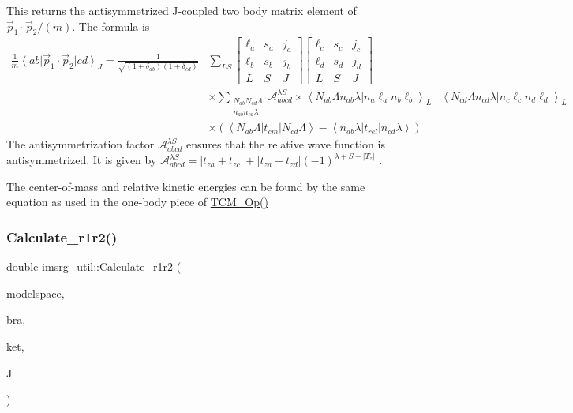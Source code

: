 This returns the antisymmetrized J-\/coupled two body matrix element of $ \vec{p}_1 \cdot \vec{p}_2 / (m) $. The formula is \begin{eqnarray*} \frac{1}{m} \left \langle a b \right| \vec{p}_1 \cdot \vec{p}_2 \left| c d \right \rangle_J = \frac{1}{\sqrt{(1+\delta_{ab})(1+\delta_{cd})}} &\sum\limits_{LS} \left[ \begin{array}{ccc} \ell_a & s_a & j_a \\ \ell_b & s_b & j_b \\ L & S & J \end{array} \right] \left[ \begin{array}{ccc} \ell_c & s_c & j_c \\ \ell_d & s_d & j_d \\ L & S & J \end{array} \right] & \\ & \times \sum\limits_{\substack{N_{ab}N_{cd} \Lambda \\ n_{ab} n_{cd} \lambda}} \mathcal{A}_{abcd}^{\lambda S} \times \left\langle N_{ab}\Lambda n_{ab} \lambda | n_{a} \ell_{a} n_{b} \ell_{b} \right\rangle_{L} & \left\langle N_{cd}\Lambda n_{cd} \lambda | n_{c} \ell_{c} n_{d} \ell_{d} \right\rangle_{L} \\ & \times \left( \left\langle N_{ab}\Lambda | t_{cm} | N_{cd} \Lambda \right \rangle -\left\langle n_{ab}\lambda | t_{rel} | n_{cd} \lambda \right \rangle \right) \end{eqnarray*} The antisymmetrization factor $ \mathcal{A}_{abcd}^{\lambda S} $ ensures that the relative wave function is antisymmetrized. It is given by $ \mathcal{A}_{abcd}^{\lambda S} = \left|t_{za}+t_{zc}\right| + \left| t_{za} + t_{zd} \right| (-1)^{\lambda + S + \left|T_z\right|}$ .

The center-\/of-\/mass and relative kinetic energies can be found by the same equation as used in the one-\/body piece of \hyperlink{namespaceimsrg__util_a9b3d4919bee84bfc3887cddb802ea643}{T\+C\+M\+\_\+\+Op()} \mbox{\label{namespaceimsrg__util_aa5d72d0bd9c75beb54256188e9ccfcbe}} 
\subsubsection{\texorpdfstring{Calculate\+\_\+r1r2()}{Calculate\_r1r2()}}
{\footnotesize\ttfamily double imsrg\+\_\+util\+::\+Calculate\+\_\+r1r2 (\begin{DoxyParamCaption}\item[{\hyperlink{classModelSpace}{Model\+Space} \&}]{modelspace,  }\item[{\hyperlink{classKet}{Ket} \&}]{bra,  }\item[{\hyperlink{classKet}{Ket} \&}]{ket,  }\item[{int}]{J }\end{DoxyParamCaption})}


